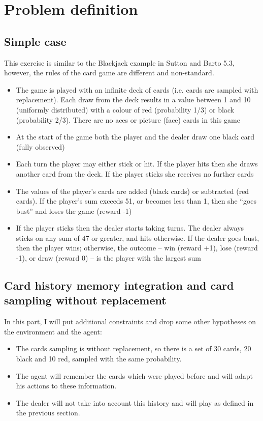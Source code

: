\documentclass[12pt,a4paper]{article}
\begin{document}
\newpage
\section{Problem definition}

\subsection{Simple case}
This exercise is similar to the Blackjack
example in Sutton and Barto 5.3, however, the rules of the
card game are different and non-standard.
\begin{itemize}
\item The game is played with an infinite deck of cards (i.e. cards are sampled
with replacement). Each draw from the deck results in a value between 1 and 10 (uniformly
distributed) with a colour of red (probability 1/3) or black (probability
2/3). There are no aces or picture (face) cards in this game
\item At the start of the game both the player and the dealer draw one black
card (fully observed)
\item Each turn the player may either stick or hit. If the player hits then she draws another card from the deck. If the player sticks she receives no further cards
\item The values of the player’s cards are added (black cards) or subtracted (red
cards). If the player’s sum exceeds 51, or becomes less than 1, then she “goes
bust” and loses the game (reward -1)
\item If the player sticks then the dealer starts taking turns. The dealer always
sticks on any sum of 47 or greater, and hits otherwise. If the dealer goes
bust, then the player wins; otherwise, the outcome – win (reward +1),
lose (reward -1), or draw (reward 0) – is the player with the largest sum
\end{itemize}
 
\subsection{Card history memory integration and card sampling without replacement}
In this part, I will put additional constraints and drop some other hypotheses on the environment and the agent: 
 
\begin{itemize}
\item The cards sampling is without replacement, so there is a set of 30 cards, 20 black and 10 red, sampled with the same probability.
\item The agent will remember the cards which were played before and will adapt his actions to these information.
\item The dealer will not take into account this history and will play as defined in the previous section.
\end{itemize}
\newpage
\end{document}
